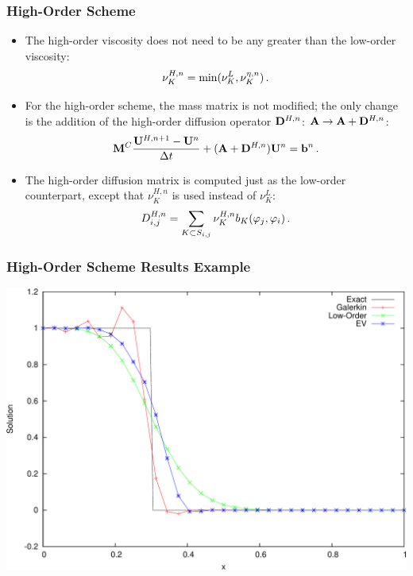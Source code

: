 \documentclass{beamer} \useoutertheme{infolines}
\begin{document}
\begin{frame}
\frametitle{High-Order Scheme}

\begin{itemize}
   \item The high-order viscosity does not need to be any greater than the
      low-order viscosity:
      \begin{equation}
         \nu^{H,n}_K = \min(\nu^{L}_K,\nu^{\eta,n}_K) \,.
      \end{equation}
   \item For the high-order scheme, the mass matrix is not modified; the
      only change is the addition of the high-order diffusion operator
      $\diffusionmatrix^{H,n}$:
      $\ssmatrix \rightarrow \ssmatrix + \diffusionmatrix^{H,n}$:
      \begin{equation}
        \consistentmassmatrix\frac{\solutionvector^{H,n+1}
          -\solutionvector^n}{\dt} + (\ssmatrix + \diffusionmatrix^{H,n})
          \solutionvector^n = \ssrhs^n \eqp
      \end{equation}
   \item The high-order diffusion matrix is computed just as the low-order
      counterpart, except that $\nu^{H,n}_K$ is used instead of $\nu^{L}_K$:
      \begin{equation}
         D_{i,j}^{H,n} = \sum\limits_{K\subset S_{i,j}}\nu_K^{H,n}
            b_K(\varphi_j,\varphi_i) \,.
      \end{equation}
\end{itemize}

\end{frame}
\begin{frame}
\frametitle{High-Order Scheme Results Example}

\includegraphics[width=\textwidth]{./figures/advection_high_order.pdf}

\end{frame}
\end{document}
